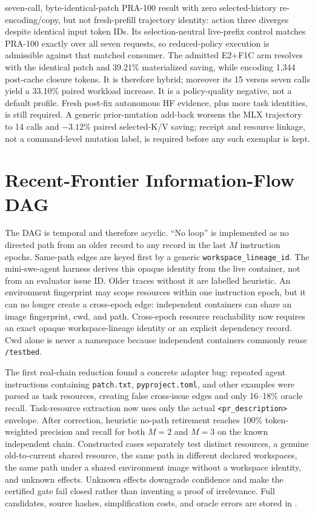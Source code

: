 \documentclass[11pt]{article}
\begin{document}
seven-call, byte-identical-patch PRA-100 result with zero selected-history
re-encoding/copy, but not fresh-prefill trajectory identity: action three
diverges despite identical input token IDs.  Its selection-neutral live-prefix
control matches PRA-100 exactly over all seven requests, so reduced-policy
execution is admissible against that matched consumer.  The admitted E2+F1C
arm resolves with the identical patch and 39.21\% materialized saving, while
encoding 1,344 post-cache closure tokens.  It is therefore hybrid; moreover its
15 versus seven calls yield a 33.10\% paired workload increase.  It is a
policy-quality negative, not a default profile.  Fresh post-fix
autonomous HF evidence, plus more task identities, is still required.  A
generic prior-mutation add-back worsens the MLX trajectory to 14 calls and
$-3.12$\% paired selected-K/V saving; receipt and resource linkage, not a
command-level mutation label, is required before any such exemplar is kept.

\clearpage
\section{Recent-Frontier Information-Flow DAG}

The DAG is temporal and therefore acyclic.  ``No loop'' is implemented as no
directed path from an older record to any record in the last $M$ instruction
epochs.  Same-path edges are keyed first by a generic
\texttt{workspace\_lineage\_id}.  The mini-swe-agent harness derives this opaque
identity from the live container, not from an evaluator issue ID.  Older traces
without it are labelled heuristic.  An environment fingerprint may scope
resources within one instruction epoch, but it can no longer create a
cross-epoch edge: independent containers can share an image fingerprint, cwd,
and path.  Cross-epoch resource reachability now requires an exact opaque
workspace-lineage identity or an explicit dependency record.  Cwd alone is
never a namespace because independent containers commonly reuse
\texttt{/testbed}.

The first real-chain reduction found a concrete adapter bug: repeated agent
instructions containing \texttt{patch.txt}, \texttt{pyproject.toml}, and other
examples were parsed as task resources, creating false cross-issue edges and
only 16--18\% oracle recall.  Task-resource extraction now uses only the actual
\texttt{<pr\_description>} envelope.  After correction, heuristic no-path
retirement reaches 100\% token-weighted precision and recall for both $M=2$
and $M=3$ on the known independent chain.  Constructed cases separately test
distinct resources, a genuine old-to-current shared resource, the same path in
different declared workspaces, the same path under a shared environment image
without a workspace identity, and unknown effects.  Unknown effects downgrade
confidence and make the certified gate fail closed rather than inventing a
proof of irrelevance.  Full candidates, source hashes, simplification costs,
and oracle errors are stored in
.
\end{document}
